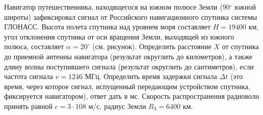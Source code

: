 
Навигатор путешественника, находящегося на южном полюсе Земли (90$^{\circ}$ южной широты) зафиксировал сигнал от 
Российского навигационного спутника системы ГЛОНАСС. Высота полета спутника над уровнем моря составляет $H=19400$ км, угол 
отклонения спутника от оси вращения Земли, выходящей из южного полюса, составляет $\alpha=20^{\circ}$ (см. рисунок). 
Определить расстояние $X$ от спутника до приемной антенны навигатора (результат округлить до километров), а 
также длину волны поступившего сигнала (результат округлить до сантиметров), если частота сигнала $v=1246$ МГц. 
Определить время задержки сигнала $\Delta t$ (это время, через которое сигнал, испущенный передающим устройством 
спутника, фиксируется навигатором), ответ дать в мс. Скорость распространения радиоволн принять равной $c=3\cdot 108$ м/с, 
радиус Земли $R_\text{З}=6400$ км.

